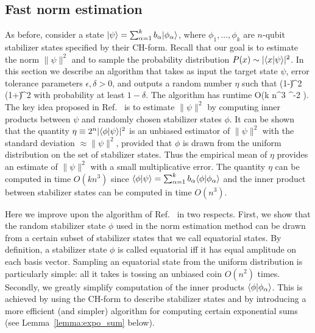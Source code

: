 \subsection{Fast norm estimation}
\label{Sec_fast_norm}
As before, consider a state
$|\psi\rangle=\sum_{\alpha=1}^k b_\alpha |\phi_\alpha\rangle$,
where $\phi_1,\ldots,\phi_k$ are $n$-qubit stabilizer states
specified by their CH-form.
Recall that our goal is to 
estimate the norm $\|\psi\|^2$ and to sample the probability
distribution $P(x)\sim |\langle x|\psi\rangle|^2$.
In this section 
we describe an algorithm that takes 
as input the target state $\psi$,
error tolerance parameters $\epsilon,\delta>0$, and
outputs a random number $\eta$ such that 
\be
\label{approx}
(1-\epsilon)\| \psi\|^2 \le \eta \le (1+\epsilon)\|\psi\|^2 
\ee
with probability at least $1-\delta$. The algorithm has runtime  
\be
\label{runtime}
O(k n^3 \epsilon^{-2} ).
\ee
The key  idea  proposed in Ref.~\cite{bravyi2016improved}
is to estimate $\|\psi\|^2$ by computing inner products
between $\psi$ and randomly chosen stabilizer states $\phi$.
It can be shown~\cite{bravyi2016improved} that
the quantity $\eta \equiv 2^n |\langle \phi|\psi\rangle|^2$ is an unbiased estimator of 
$\|\psi\|^2$ with the standard deviation  $\approx \|\psi\|^2$,
provided that $\phi$ is drawn from the uniform distribution on the set of
stabilizer states. 
Thus the empirical mean of $\eta$ provides an estimate of $\|\psi\|^2$ with a small multiplicative error. 
The quantity $\eta$ can be computed in time $O(k n^3)$ since
$\langle \phi|\psi\rangle=\sum_{\alpha=1}^k b_\alpha \langle \phi|\phi_\alpha\rangle$
and the inner product between stabilizer states can be computed in time $O(n^3)$.

Here we improve upon the algorithm of Ref.~\cite{bravyi2016improved} 
in two respects. First, we show that 
the random stabilizer state $\phi$ used in the norm estimation method
can be drawn from a certain subset of stabilizer states that we call equatorial states. 
By definition, a stabilizer state $\phi$ is called equatorial iff it has equal amplitude
on each basis vector.  Sampling an equatorial state from the uniform distribution 
is particularly simple: all it takes is  tossing an unbiased coin $O(n^2)$ times. 
Secondly, we greatly simplify computation of the inner products $\langle \phi |\phi_\alpha\rangle$.
This is achieved by using the CH-form to describe stabilizer states
and by introducing a more efficient (and simpler) algorithm for computing
certain exponential sums (see Lemma~\ref{lemma:expo_sum} below).
 
